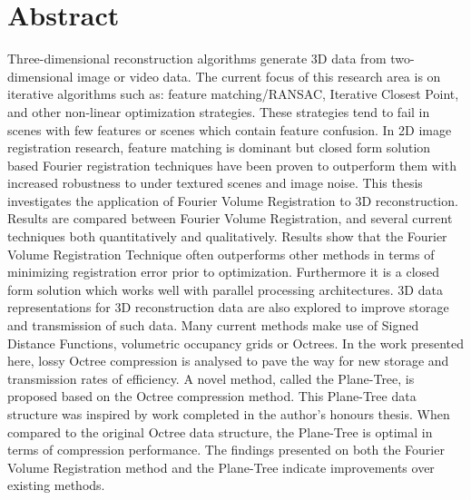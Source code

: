 \makeatletter
\chapter{Abstract}

Three-dimensional reconstruction algorithms generate 3D data from two-dimensional image or video data. The current focus of this research area is on iterative algorithms such as: feature matching/RANSAC, Iterative Closest Point, and other non-linear optimization strategies. These strategies tend to fail in scenes with few features or scenes which contain feature confusion. In 2D image registration research, feature matching is dominant but closed form solution based Fourier registration techniques have been proven to outperform them with increased robustness to under textured scenes and image noise. This thesis investigates the application of Fourier Volume Registration to 3D reconstruction. Results are compared between Fourier Volume Registration, and several current techniques both quantitatively and qualitatively. Results show that the Fourier Volume Registration Technique often outperforms other methods in terms of minimizing registration error prior to optimization. Furthermore it is a closed form solution which works well with parallel processing architectures. 3D data representations for 3D reconstruction data are also explored to improve storage and transmission of such data. Many current methods make use of Signed Distance Functions, volumetric occupancy grids or Octrees. In the work presented here, lossy Octree compression is analysed to pave the way for new storage and transmission rates of efficiency. A novel method, called the Plane-Tree, is proposed based on the Octree compression method. This Plane-Tree data structure was inspired by work completed in the author's honours thesis. When compared to the original Octree data structure, the Plane-Tree is optimal in terms of compression performance. The findings presented on both the Fourier Volume Registration method and the Plane-Tree indicate improvements over existing methods.


